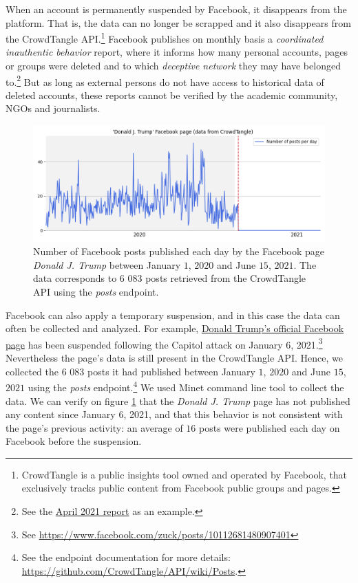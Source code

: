 \documentclass{article}
\begin{document}
When an account is permanently suspended by Facebook, it disappears from the platform. That is,  the data can no longer be scrapped and it also disappears from the CrowdTangle API.\footnote{CrowdTangle is a public insights tool owned and operated by Facebook, that exclusively tracks public content from Facebook public groups and pages.} Facebook publishes on monthly basis a {\it coordinated inauthentic behavior} report, where it informs how many personal accounts, pages or groups were deleted and to which {\it deceptive network} they may have belonged to.\footnote{See the \href{https://about.fb.com/news/2021/05/april-2021-coordinated-inauthentic-behavior-report/}{April 2021 report} as an example.} 
But as long as external persons do not have access to historical data of deleted accounts, these reports cannot be verified by the academic community, NGOs and journalists.

\begin{figure}[h]
	\centering
			\includegraphics[scale=0.32]{../figure/facebook_crowdtangle_trump.png}
	\caption{Number of Facebook posts published each day by the Facebook page {\it Donald J. Trump} between January $1$, $2020$ and June $15$, $2021$. The data corresponds to $6$ $083$ posts retrieved from the CrowdTangle API using the {\it posts} endpoint.}
	\label{fig1_fb}
\end{figure}

Facebook can also apply a temporary suspension, and in this case the data can often be collected and analyzed. For example, \href{https://www.facebook.com/DonaldTrump/}{Donald Trump’s official Facebook page}  has been suspended following the Capitol attack on January 6, 2021.\footnote{See \href{https://www.facebook.com/zuck/posts/10112681480907401}{https://www.facebook.com/zuck/posts/10112681480907401}} Nevertheless the page’s data is still present in the CrowdTangle API. 
Hence, we collected the $6$ $083$ posts it had published between January $1$, $2020$ and June $15$, $2021$ using the {\it posts} endpoint.\footnote{See the endpoint documentation for more details: \href{https://github.com/CrowdTangle/API/wiki/Posts}{https://github.com/CrowdTangle/API/wiki/Posts}.} We used Minet command line tool \cite{minet} to collect the data. We can verify on figure \ref{fig1_fb} that the {\it Donald J. Trump} page has not published any content since January $6$, 2021, and that this behavior is not consistent with the page’s previous activity: an average of $16$ posts were published each day on Facebook before the suspension. 
\end{document}
